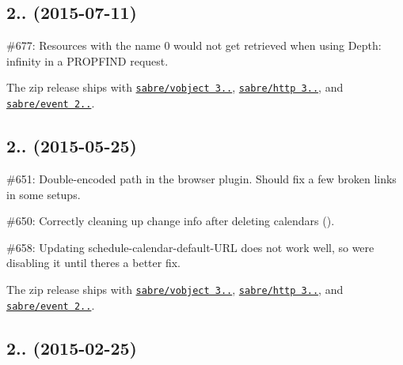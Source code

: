 \subsection*{2.. (2015-\/07-\/11) }


\begin{DoxyItemize}
\item \#677\+: Resources with the name \textquotesingle{}0\textquotesingle{} would not get retrieved when using {\ttfamily Depth\+: infinity} in a {\ttfamily P\+R\+O\+P\+F\+I\+ND} request.
\item The zip release ships with \href{http://sabre.io/vobject/}{\tt sabre/vobject 3..}, \href{http://sabre.io/http/}{\tt sabre/http 3..}, and \href{http://sabre.io/event/}{\tt sabre/event 2..}.
\end{DoxyItemize}

\subsection*{2.. (2015-\/05-\/25) }


\begin{DoxyItemize}
\item \#651\+: Double-\/encoded path in the browser plugin. Should fix a few broken links in some setups.
\item \#650\+: Correctly cleaning up change info after deleting calendars ().
\item \#658\+: Updating {\ttfamily schedule-\/calendar-\/default-\/\+U\+RL} does not work well, so we\textquotesingle{}re disabling it until there\textquotesingle{}s a better fix.
\item The zip release ships with \href{http://sabre.io/vobject/}{\tt sabre/vobject 3..}, \href{http://sabre.io/http/}{\tt sabre/http 3..}, and \href{http://sabre.io/event/}{\tt sabre/event 2..}.
\end{DoxyItemize}

\subsection*{2.. (2015-\/02-\/25) }


